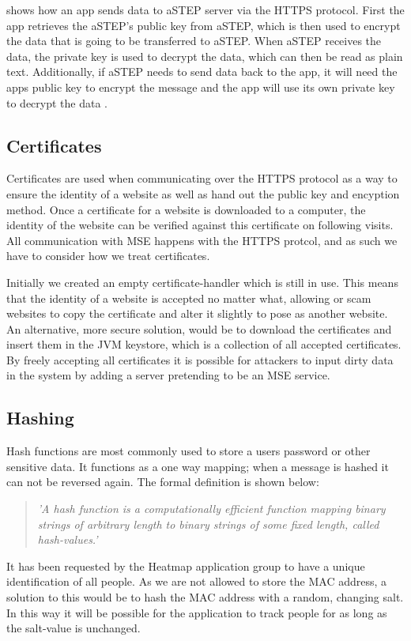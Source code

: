  shows how an app sends data to aSTEP server via the HTTPS protocol. First the app retrieves the aSTEP's public key from aSTEP, which is then used to encrypt the data that is going to be transferred to aSTEP. When aSTEP receives the data, the private key is used to decrypt the data, which can then be read as plain text. Additionally, if aSTEP needs to send data back to the app, it will need the apps public key to encrypt the message and the app will use its own private key to decrypt the data \cite{HTTPS}.

\subsection*{Certificates}
Certificates are used when communicating over the HTTPS protocol as a way to ensure the identity of a website as well as hand out the public key and encyption method. Once a certificate for a website is downloaded to a computer, the identity of the website can be verified against this certificate on following visits. All communication with MSE happens with the HTTPS protcol, and as such we have to consider how we treat certificates. 

Initially we created an empty certificate-handler which is still in use. This means that the identity of a website is accepted no matter what, allowing or scam websites to copy the certificate and alter it slightly to pose as another website. An alternative, more secure solution, would be to download the certificates and insert them in the JVM keystore, which is a collection of all accepted certificates. By freely accepting all certificates it is possible for attackers to input dirty data in the system by adding a server pretending to be an MSE service.

\subsection*{Hashing}
Hash functions are most commonly used to store a users password or other sensitive data. It functions as a one way mapping; when a message is hashed it can not be reversed again. The formal definition is shown below:
\begin{quote}
\textit{'A hash function is a computationally efficient function mapping binary strings of arbitrary length to binary strings of some fixed length, called hash-values.' \cite{Hash_def}}
\end{quote}

It has been requested by the Heatmap application group to have a unique identification of all people. As we are not allowed to store the MAC address, a solution to this would be to hash the MAC address with a random, changing salt. In this way it will be possible for the application to track people for as long as the salt-value is unchanged.

